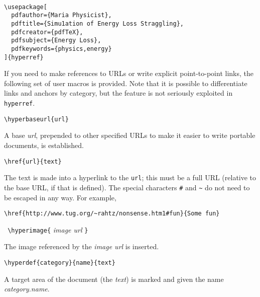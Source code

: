 \begin{verbatim}

\usepackage[ 
  pdfauthor={Maria Physicist}, 
  pdftitle={Simu1ation of Energy Loss Straggling}, 
  pdfcreator={pdfTeX}, 
  pdfsubject={Energy Loss}, 
  pdfkeywords={physics,energy} 
]{hyperref} 

\end{verbatim}
 
 

If you need to make references to URLs or write explicit point-to-point links, the 
following set of user macros is provided. Note that it is possible to differentiate links 
and anchors by category, but the feature is not seriously exploited in \verb|hyperref|. 

\begin{verbatim}
\hyperbaseurl{url} 
\end{verbatim}

A base \emph{url}, prepended to other specified URLs to make it easier to write portable 
documents, is established. 

\begin{verbatim}
\href{url}{text} 
\end{verbatim}

The text is made into a hyperlink to the \verb|url|; this must be a full URL (relative to 
the base URL, if that is defined). The special characters \verb|#| and \verb|~| do not need to be 
escaped in any way. For example, 

\begin{verbatim}
\href{http://www.tug.org/~rahtz/nonsense.htm1#fun}{Some fun} 
\end{verbatim}

\begin{fminipage}{3in}
  \verb| \hyperimage{| \emph{image url} \verb|} | 
\end{fminipage}

The image referenced by the \emph{image url} is inserted. 

\begin{verbatim}
\hyperdef{category}{name}{text} 
\end{verbatim}

A target area of the document (the \emph{text}) is marked and given the name \emph{category.name}. 

